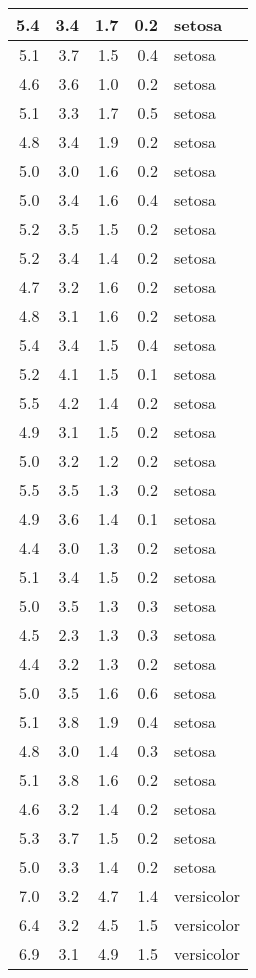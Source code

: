 \documentclass[a4paper, 10pt]{article}\usepackage[]{graphicx}\usepackage[]{color}
\begin{document}
\begin{tabular}{r|r|r|r|l}
5.4 & 3.4 & 1.7 & 0.2 & setosa\\
\hline
5.1 & 3.7 & 1.5 & 0.4 & setosa\\
\hline
4.6 & 3.6 & 1.0 & 0.2 & setosa\\
\hline
5.1 & 3.3 & 1.7 & 0.5 & setosa\\
\hline
4.8 & 3.4 & 1.9 & 0.2 & setosa\\
\hline
5.0 & 3.0 & 1.6 & 0.2 & setosa\\
\hline
5.0 & 3.4 & 1.6 & 0.4 & setosa\\
\hline
5.2 & 3.5 & 1.5 & 0.2 & setosa\\
\hline
5.2 & 3.4 & 1.4 & 0.2 & setosa\\
\hline
4.7 & 3.2 & 1.6 & 0.2 & setosa\\
\hline
4.8 & 3.1 & 1.6 & 0.2 & setosa\\
\hline
5.4 & 3.4 & 1.5 & 0.4 & setosa\\
\hline
5.2 & 4.1 & 1.5 & 0.1 & setosa\\
\hline
5.5 & 4.2 & 1.4 & 0.2 & setosa\\
\hline
4.9 & 3.1 & 1.5 & 0.2 & setosa\\
\hline
5.0 & 3.2 & 1.2 & 0.2 & setosa\\
\hline
5.5 & 3.5 & 1.3 & 0.2 & setosa\\
\hline
4.9 & 3.6 & 1.4 & 0.1 & setosa\\
\hline
4.4 & 3.0 & 1.3 & 0.2 & setosa\\
\hline
5.1 & 3.4 & 1.5 & 0.2 & setosa\\
\hline
5.0 & 3.5 & 1.3 & 0.3 & setosa\\
\hline
4.5 & 2.3 & 1.3 & 0.3 & setosa\\
\hline
4.4 & 3.2 & 1.3 & 0.2 & setosa\\
\hline
5.0 & 3.5 & 1.6 & 0.6 & setosa\\
\hline
5.1 & 3.8 & 1.9 & 0.4 & setosa\\
\hline
4.8 & 3.0 & 1.4 & 0.3 & setosa\\
\hline
5.1 & 3.8 & 1.6 & 0.2 & setosa\\
\hline
4.6 & 3.2 & 1.4 & 0.2 & setosa\\
\hline
5.3 & 3.7 & 1.5 & 0.2 & setosa\\
\hline
5.0 & 3.3 & 1.4 & 0.2 & setosa\\
\hline
7.0 & 3.2 & 4.7 & 1.4 & versicolor\\
\hline
6.4 & 3.2 & 4.5 & 1.5 & versicolor\\
\hline
6.9 & 3.1 & 4.9 & 1.5 & versicolor\\

\end{tabular}
\end{document}
